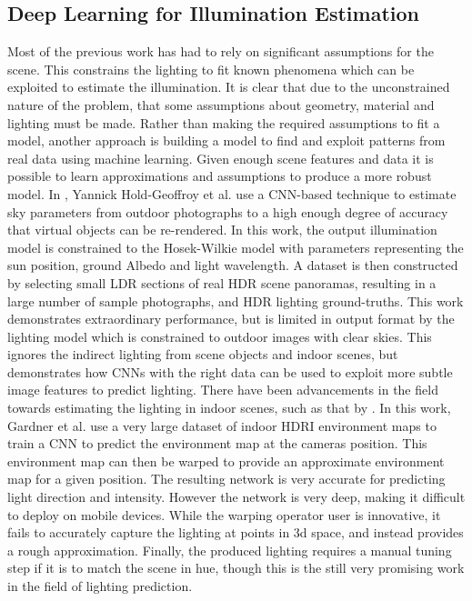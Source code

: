 \documentclass[ %
                    author={Gavin Parker},
                supervisor={Dr. Neill Campbell},
                    degree={MEng},
                     title={Deep Learning for Illumination Estimation from Stereo Images},
                  subtitle={},
                      type={Research},
                      year={2018} ]{dissertation}
\begin{document}
\subsection{Deep Learning for Illumination Estimation}
Most of the previous work has had to rely on significant assumptions for the scene. This constrains the lighting to fit known phenomena which can be exploited to estimate the illumination. It is clear that due to the unconstrained nature of the problem, that some assumptions about geometry, material and lighting must be made. Rather than making the required assumptions to fit a model, another approach is building a model to find and exploit patterns from real data using machine learning. Given enough scene features and data it is possible to learn approximations and assumptions to produce a more robust model. In \cite{holdgeoffroy-cvpr-17}, Yannick Hold-Geoffroy et al. use a CNN-based technique to estimate sky parameters from outdoor photographs to a high enough degree of accuracy that virtual objects can be re-rendered. In this work, the output illumination model is constrained to the Hosek-Wilkie model with parameters representing the sun position, ground Albedo and light wavelength. A dataset is then constructed by selecting small LDR sections of real HDR scene panoramas, resulting in a large number of sample photographs, and HDR lighting ground-truths. This work demonstrates extraordinary performance, but is limited in output format by the lighting model which is constrained to outdoor images with clear skies. This ignores the indirect lighting from scene objects and indoor scenes, but demonstrates how CNNs with the right data can be used to exploit more subtle image features to predict lighting.
\newline
There have been advancements in the field towards estimating the lighting in indoor scenes, such as that by \cite{Gardner:2017:LPI:3130800.3130891}. In this work, Gardner et al. use a very large dataset of indoor HDRI environment maps to train a CNN to predict the environment map at the cameras position. This environment map can then be warped to provide an approximate environment map for a given position. The resulting network is very accurate for predicting light direction and intensity. However the network is very deep, making it difficult to deploy on mobile devices. While the warping operator user is innovative, it fails to accurately capture the lighting at points in 3d space, and instead provides a rough approximation. Finally, the produced lighting requires a manual tuning step if it is to match the scene in hue, though this is the still very promising work in the field of lighting prediction.
\end{document}
